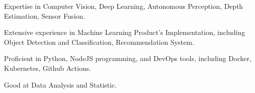 

\begin{cvparagraph}
    
\end{cvparagraph}
\begin{cvparagraph}
    
\end{cvparagraph}

\begin{cvparagraph}
  \begin{cvitems}

    \item {Expertise in Computer Vision, Deep Learning, Autonomous Perception, Depth Estimation, Sensor Fusion.}
    \item {Extensive experience in Machine Learning Product's Implementation, including Object Detection and Classification, Recommendation System.}
    \item {Proficient in Python, NodeJS programming, and DevOps tools, including Docker, Kubernetes, Github Actions.}
    \item {Good at Data Analysis and Statistic.}
  \end{cvitems}
\end{cvparagraph}
